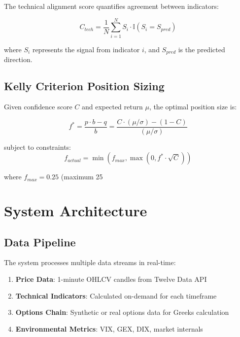 \documentclass[12pt,a4paper]{article}
\begin{document}
The technical alignment score quantifies agreement between indicators:

\begin{equation}
C_{tech} = \frac{1}{N} \sum_{i=1}^{N} S_i \cdot \mathbb{I}(S_i = S_{pred})
\end{equation}

where $S_i$ represents the signal from indicator $i$, and $S_{pred}$ is the predicted direction.

\subsection{Kelly Criterion Position Sizing}

Given confidence score $C$ and expected return $\mu$, the optimal position size is:

\begin{equation}
f^* = \frac{p \cdot b - q}{b} = \frac{C \cdot (\mu/\sigma) - (1-C)}{(\mu/\sigma)}
\end{equation}

subject to constraints:
\begin{equation}
f_{actual} = \min\left(f_{max}, \max\left(0, f^* \cdot \sqrt{C}\right)\right)
\end{equation}

where $f_{max} = 0.25$ (maximum 25%

\section{System Architecture}

\subsection{Data Pipeline}

The system processes multiple data streams in real-time:

\begin{enumerate}
    \item \textbf{Price Data}: 1-minute OHLCV candles from Twelve Data API
    \item \textbf{Technical Indicators}: Calculated on-demand for each timeframe
    \item \textbf{Options Chain}: Synthetic or real options data for Greeks calculation
    \item \textbf{Environmental Metrics}: VIX, GEX, DIX, market internals
\end{enumerate}
\end{document}
